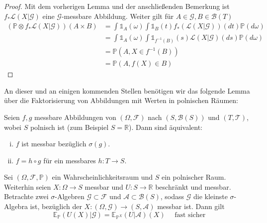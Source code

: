 \begin{proof}
Mit dem vorherigen Lemma und der anschließenden Bemerkung ist $f_*\mathcal{L}(X\vert\mathcal{G})$ eine $\mathcal{G}$-messbare Abbildung. Weiter gilt für $A\in\mathcal{G}, B\in\mathcal{B}(T)$
\begin{align*}
    (\mathbb{P}\otimes f_*\mathcal{L}(X\vert \mathcal{G}))(A\times B) &= \int \mathds{1}_A(\omega) \int \mathds{1}_B(t) f_*(\mathcal{L}(X\vert\mathcal{G}))(dt) \mathbb{P}(d\omega) \\
    &= \int \mathds{1}_A(\omega) \int \mathds{1}_{f^{-1}(B)}(s)\mathcal{L}(X\vert\mathcal{G})(ds) \mathbb{P}(d\omega) \\
    &= \mathbb{P}(A, X\in f^{-1}(B)) \\
    &= \mathbb{P}(A, f(X) \in B)
\end{align*}
\end{proof}
An dieser und an einigen kommenden Stellen benötigen wir das folgende Lemma über die Faktorisierung von Abbildungen mit Werten in polnischen Räumen:
\begin{lemma}\label{thm:factorization_lemma}
Seien $f,g$ messbare Abbildungen von $(\Omega, \mathcal{F})$ nach $(S, \mathcal{B}(S))$ und $(T, \mathcal{T})$, wobei $S$ polnisch ist (zum Beispiel $S=\mathbb{R}$). Dann sind äquivalent:
\begin{enumerate}[(i)]
    \item $f$ ist messbar bezüglich $\sigma(g)$.
    \item $f=h\circ g$ für ein messbares $h: T \rightarrow S$.
\end{enumerate}
\end{lemma}
\begin{lemma}\label{thm:pushforward_expectancy}
Sei $(\Omega, \mathcal{F}, \mathbb{P})$ ein Wahrscheinlichkeitsraum und $S$ ein polnischer Raum. Weiterhin seien $X: \Omega \rightarrow S$ messbar und $U: S\rightarrow \mathbb{R}$ beschränkt und messbar. Betrachte zwei $\sigma$-Algebren $\mathcal{G}\subset \mathcal{F}$ und $\mathcal{A} \subset \mathcal{B}(S)$, sodass $\mathcal{G}$ die kleinste $\sigma$-Algebra ist, bezüglich der $X: (\Omega, \mathcal{G}) \rightarrow (S, \mathcal{A})$ messbar ist. Dann gilt
$$\mathbb{E}_{\mathbb{P}}(U(X) \vert \mathcal{G}) = \mathbb{E}_{\mathbb{P}^X}(U \vert \mathcal{A})(X) \quad \text{ fast sicher}$$
\end{lemma}
